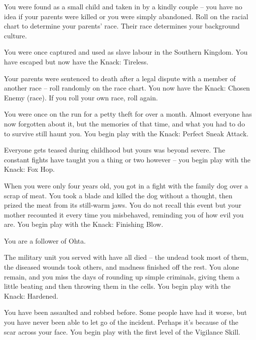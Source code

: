 \begin{multicols}{2}
\begin{list}{\addtocounter{list}{1}\textbf{:}}{\raggedleft}
  \item
  You were found as a small child and taken in by a kindly couple -- you have no idea if your parents were killed or you were simply abandoned.
  Roll on the racial chart to determine your parents' race.
  Their race determines your background culture.

  \item
  You were once captured and used as slave labour in the Southern Kingdom.
  You have escaped but now have the Knack: Tireless.

  \item
  Your parents were sentenced to death after a legal dispute with a member of another race -- roll randomly on the race chart.
  You now have the Knack: Chosen Enemy (race).
  If you roll your own race, roll again.

  \item
  You were once on the run for a petty theft for over a month.
  Almost everyone has now forgotten about it, but the memories of that time, and what you had to do to survive still haunt you.
  You begin play with the Knack: Perfect Sneak Attack.

\item
Everyone gets teased during childhood but yours was beyond severe.
The constant fights have taught you a thing or two however -- you begin play with the Knack: Fox Hop.

  \item
  When you were only four years old, you got in a fight with the family dog over a scrap of meat.
  You took a blade and killed the dog without a thought, then prized the meat from its still-warm jaws.
  You do not recall this event but your mother recounted it every time you misbehaved, reminding you of how evil you are.
  You begin play with the Knack: Finishing Blow.

  You are a follower of Ohta.

  \item
  The military unit you served with have all died -- the undead took most of them, the diseased wounds took others, and madness finished off the rest.
  You alone remain, and you miss the days of rounding up simple criminals, giving them a little beating and then throwing them in the cells.
  You begin play with the Knack: Hardened.

  \item
  You have been assaulted and robbed before.
  Some people have had it worse, but you have never been able to let go of the incident.
  Perhaps it's because of the scar across your face.
  You begin play with the first level of the Vigilance Skill.


\end{list}
\end{multicols}
